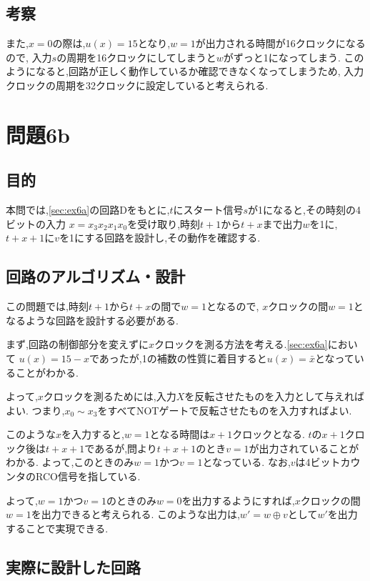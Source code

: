 \documentclass[autodetect-engine, dvi=dvipdfmx, 10pt, a4paper, ja=standard]{bxjsarticle}
\begin{document}
\subsection{考察}
また,$x = 0$の際は,$u(x) = 15$となり,$w = 1$が出力される時間が16クロックになるので,
入力$s$の周期を16クロックにしてしまうと$w$がずっと1になってしまう.
このようになると,回路が正しく動作しているか確認できなくなってしまうため,
入力クロックの周期を32クロックに設定していると考えられる.

\section{問題6b}

\subsection{目的}
本問では,\ref{sec:ex6a}の回路Dをもとに,$t$にスタート信号$s$が1になると,その時刻の4ビットの入力
$x = x_3 x_2 x_1 x_0$を受け取り,時刻$t+1$から$t+x$まで出力$w$を1に,
$t + x + 1$に$v$を1にする回路を設計し,その動作を確認する.

\subsection{回路のアルゴリズム・設計}

この問題では,時刻$t + 1$から$t + x$の間で$w = 1$となるので,
$x$クロックの間$w = 1$となるような回路を設計する必要がある.

まず,回路の制御部分を変えずに$x$クロックを測る方法を考える.\ref{sec:ex6a}において
$u(x) = 15 - x$であったが,1の補数の性質に着目すると$u(x) = \bar{x}$となっていることがわかる.

よって,$x$クロックを測るためには,入力$X$を反転させたものを入力として与えればよい.
つまり,$x_0 \sim x_3$をすべてNOTゲートで反転させたものを入力すればよい.

このような$x$を入力すると,$w = 1$となる時間は$x + 1$クロックとなる.
$t$の$x + 1$クロック後は$t + x + 1$であるが,問より$t + x + 1$のとき$v = 1$が出力されていることがわかる.
よって,このときのみ$w = 1$かつ$v = 1$となっている.
なお,$v$は4ビットカウンタのRCO信号を指している.

よって,$w = 1$かつ$v = 1$のときのみ$w = 0$を出力するようにすれば,$x$クロックの間$w = 1$を出力できると考えられる.
このような出力は,$w' = w \oplus v$として$w'$を出力することで実現できる.

\subsection{実際に設計した回路}
\end{document}
